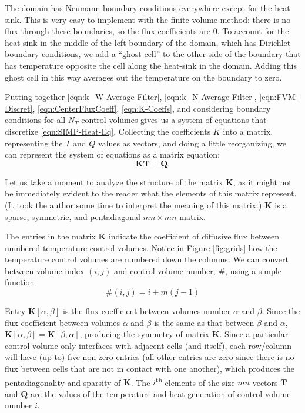 The domain has Neumann boundary conditions everywhere except for the heat sink. This is very easy to implement with the finite volume method: there is no flux through these boundaries, so the flux coefficients are 0. To account for the heat-sink in the middle of the left boundary of the domain, which has Dirichlet boundary conditions, we add a ``ghost cell'' to the other side of the boundary that has temperature opposite the cell along the heat-sink in the domain. Adding this ghost cell in this way averages out the temperature on the boundary to zero.

Putting together \eqref{eqn:k_W-Average-Filter}, \eqref{eqn:k_N-Average-Filter}, \eqref{eqn:FVM-Discret}, \eqref{eqn:CenterFluxCoeff}, \eqref{eqn:K-Coeffs}, and considering boundary conditions for all $N_T$ control volumes gives us a system of equations that discretize \eqref{eqn:SIMP-Heat-Eq}. Collecting the coefficients $K$ into a matrix, representing the $T$ and $Q$ values as vectors, and doing a little reorganizing, we can represent the system of equations as a matrix equation:
\begin{equation}
	\mathbf{K}\mathbf{T}=\mathbf{Q}.\label{eqn:KTQ-Matrix-Eqn}
\end{equation}

Let us take a moment to analyze the structure of the matrix $\mathbf{K}$, as it might not be immediately evident to the reader what the elements of this matrix represent. (It took the author some time to interpret the meaning of this matrix.) $\mathbf{K}$ is a sparse, symmetric, and pentadiagonal $mn\times mn$ matrix.

The entries in the matrix $\mathbf{K}$ indicate the coefficient of diffusive flux between numbered temperature control volumes. Notice in Figure \ref{fig:grids} how the temperature control volumes are numbered down the columns. We can convert between volume index $(i,j)$ and control volume number, $\#$, using a simple function
\begin{equation}
	\#(i,j)=i+m(j-1)\label{eqn:cord2num}
\end{equation}

Entry $\mathbf{K}[\alpha,\beta]$ is the flux coefficient between volumes number $\alpha$ and $\beta$. Since the flux coefficient between volumes $\alpha$ and $\beta$ is the same as that between $\beta$ and $\alpha$, $\mathbf{K}[\alpha,\beta]=\mathbf{K}[\beta,\alpha]$, producing the symmetry of matrix $\mathbf{K}$. Since a particular control volume only interfaces with adjacent cells (and itself), each row/column will have (up to) five non-zero entries (all other entries are zero since there is no flux between cells that are not in contact with one another), which produces the pentadiagonality and sparsity of $\mathbf{K}$. The $i$\textsuperscript{th} elements of the size $mn$ vectors $\mathbf{T}$ and $\mathbf{Q}$ are the values of the temperature and heat generation of control volume number $i$.

